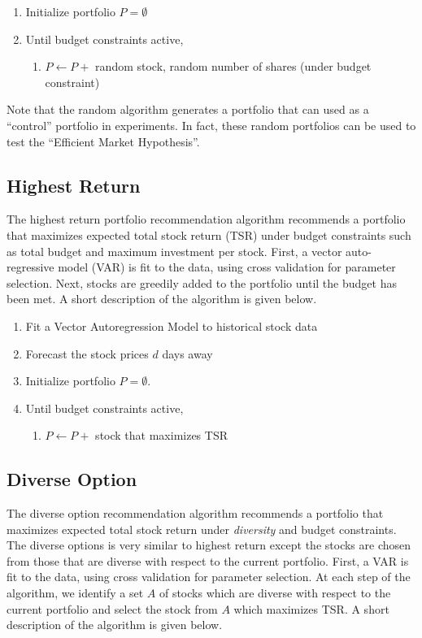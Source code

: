 \documentclass{article}
\begin{document}
\begin{enumerate}
	\item Initialize portfolio $P = \emptyset$
	\item Until budget constraints active,
		\begin{enumerate}
			\item $P \leftarrow P +$ random stock, random number of shares (under budget constraint)
		\end{enumerate}
\end{enumerate}

Note that the random algorithm generates a portfolio that can used as a ``control'' portfolio in experiments. In fact, these random portfolios can be used to test the ``Efficient Market Hypothesis''.

\subsection{Highest Return}
The highest return portfolio recommendation algorithm recommends a portfolio that maximizes expected total stock return (TSR) under budget constraints such as total budget and maximum investment per stock. First, a vector auto-regressive model (VAR) is fit to the data, using cross validation for parameter selection. Next, stocks are greedily added to the portfolio until the budget has been met. A short description of the algorithm is given below.

\begin{enumerate}
	\item Fit a Vector Autoregression Model to historical stock data
	\item Forecast the stock prices $d$ days away
	\item Initialize portfolio $P = \emptyset$. 
	\item Until budget constraints active,
		\begin{enumerate}
			\item $P \leftarrow P +$ stock that maximizes TSR
		\end{enumerate}
\end{enumerate}

\subsection{Diverse Option}
The diverse option recommendation algorithm recommends a portfolio that maximizes expected total stock return under \emph{diversity} and budget constraints. The diverse options is very similar to highest return except the stocks are chosen from those that are diverse with respect to the current portfolio. First, a VAR is fit to the data, using cross validation for parameter selection. At each step of the algorithm, we identify a set $A$ of stocks which are diverse with respect to the current portfolio and select the stock from $A$ which maximizes TSR. A short description of the algorithm is given below.
\end{document}
